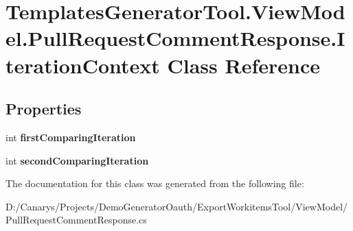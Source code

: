 \hypertarget{class_templates_generator_tool_1_1_view_model_1_1_pull_request_comment_response_1_1_iteration_context}{}\section{Templates\+Generator\+Tool.\+View\+Model.\+Pull\+Request\+Comment\+Response.\+Iteration\+Context Class Reference}
\label{class_templates_generator_tool_1_1_view_model_1_1_pull_request_comment_response_1_1_iteration_context}
\subsection*{Properties}
\begin{DoxyCompactItemize}
\item 
\mbox{\label{class_templates_generator_tool_1_1_view_model_1_1_pull_request_comment_response_1_1_iteration_context_a772b9b5faf4cd9bbf61a910395011c36}} 
int {\bfseries first\+Comparing\+Iteration}
\item 
\mbox{\label{class_templates_generator_tool_1_1_view_model_1_1_pull_request_comment_response_1_1_iteration_context_a4012b1e389417656bc070b995e788c44}} 
int {\bfseries second\+Comparing\+Iteration}
\end{DoxyCompactItemize}


The documentation for this class was generated from the following file\+:\begin{DoxyCompactItemize}
\item 
D\+:/\+Canarys/\+Projects/\+Demo\+Generator\+Oauth/\+Export\+Workitems\+Tool/\+View\+Model/Pull\+Request\+Comment\+Response.\+cs\end{DoxyCompactItemize}
